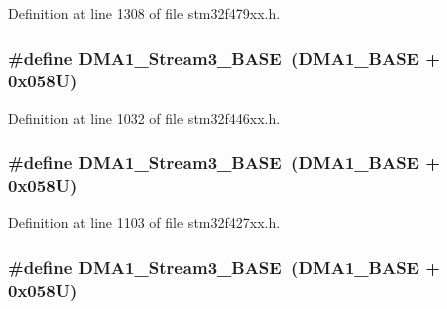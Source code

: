 Definition at line 1308 of file stm32f479xx.\+h.

\subsubsection[{\texorpdfstring{D\+M\+A1\+\_\+\+Stream3\+\_\+\+B\+A\+SE}{DMA1_Stream3_BASE}}]{\setlength{\rightskip}{0pt plus 5cm}\#define D\+M\+A1\+\_\+\+Stream3\+\_\+\+B\+A\+SE~({\bf D\+M\+A1\+\_\+\+B\+A\+SE} + 0x058\+U)}\hypertarget{group___peripheral__memory__map_gac51deb54ff7cfe1290dfcf517ae67127}{}\label{group___peripheral__memory__map_gac51deb54ff7cfe1290dfcf517ae67127}


Definition at line 1032 of file stm32f446xx.\+h.

\subsubsection[{\texorpdfstring{D\+M\+A1\+\_\+\+Stream3\+\_\+\+B\+A\+SE}{DMA1_Stream3_BASE}}]{\setlength{\rightskip}{0pt plus 5cm}\#define D\+M\+A1\+\_\+\+Stream3\+\_\+\+B\+A\+SE~({\bf D\+M\+A1\+\_\+\+B\+A\+SE} + 0x058\+U)}\hypertarget{group___peripheral__memory__map_gac51deb54ff7cfe1290dfcf517ae67127}{}\label{group___peripheral__memory__map_gac51deb54ff7cfe1290dfcf517ae67127}


Definition at line 1103 of file stm32f427xx.\+h.

\subsubsection[{\texorpdfstring{D\+M\+A1\+\_\+\+Stream3\+\_\+\+B\+A\+SE}{DMA1_Stream3_BASE}}]{\setlength{\rightskip}{0pt plus 5cm}\#define D\+M\+A1\+\_\+\+Stream3\+\_\+\+B\+A\+SE~({\bf D\+M\+A1\+\_\+\+B\+A\+SE} + 0x058\+U)}\hypertarget{group___peripheral__memory__map_gac51deb54ff7cfe1290dfcf517ae67127}{}\label{group___peripheral__memory__map_gac51deb54ff7cfe1290dfcf517ae67127}


